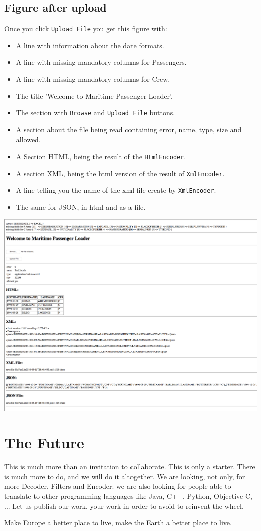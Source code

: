 \documentclass[a4paper, 11pt]{article}
\begin{document}
\subsection{Figure after upload}
\label{fig:after}
Once you click \texttt{Upload File} you get this figure with:
\begin{itemize}
\item A line with information about the date formats.
\item A line with missing mandatory columns for Passengers.
\item A line with missing mandatory columns for Crew.
\item The title 'Welcome to Maritime Passenger Loader'.
\item The section with \texttt{Browse} and \texttt{Upload File} buttons.
\item A section about the file being read containing error, name, type, size and allowed.
\item A Section HTML, being the result of the \texttt{HtmlEncoder}.
\item A section XML, being the html version of the result of \texttt{XmlEncoder}.
\item A line telling you the name of the xml file create by \texttt{XmlEncoder}.
\item The same for JSON, in html and as a file.
\end{itemize}
\includegraphics{figures/after}

\section{The Future}
This is much more than an invitation to collaborate. This is only a starter. There is much more to do, and we will do it altogether. We are looking, not only, for more Decoder, Filters and Encoder: we are also looking for people able to translate to other programming languages like Java, C++, Python, Objective-C, ... Let us publish our work, your work in order to avoid to reinvent the wheel. 

Make Europe a better place to live, make the Earth a better place to live.
\end{document}
